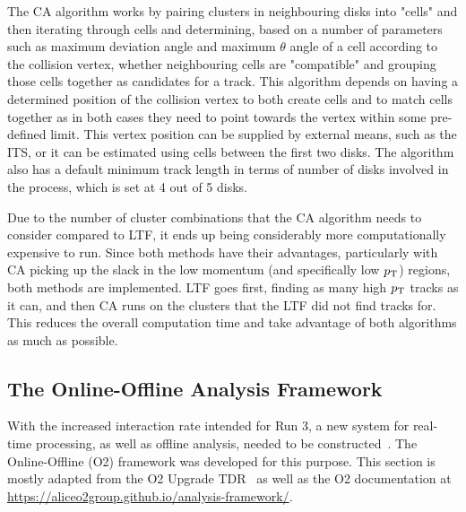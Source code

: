 The CA algorithm works by pairing clusters in neighbouring disks into "cells" and then iterating through cells and determining, based on a number of parameters such as maximum deviation angle and maximum $\theta$ angle of a cell according to the collision vertex, whether neighbouring cells are "compatible" and grouping those cells together as candidates for a track. This algorithm depends on having a determined position of the collision vertex to both create cells and to match cells together as in both cases they need to point towards the vertex within some pre-defined limit. This vertex position can be supplied by external means, such as the ITS, or it can be estimated using cells between the first two disks. The algorithm also has a default minimum track length in terms of number of disks involved in the process, which is set at 4 out of 5 disks. 

Due to the number of cluster combinations that the CA algorithm needs to consider compared to LTF, it ends up being considerably more computationally expensive to run. Since both methods have their advantages, particularly with CA picking up the slack in the low momentum (and specifically low $p_\mathrm{T}$) regions, both methods are implemented. LTF goes first, finding as many high $p_\mathrm{T}$ tracks as it can, and then CA runs on the clusters that the LTF did not find tracks for. This reduces the overall computation time and take advantage of both algorithms as much as possible. 


\subsection{The Online-Offline Analysis Framework}
With the increased interaction rate intended for Run 3, a new system for real-time processing, as well as offline analysis, needed to be constructed~\cite{ALICE_Upgrade_LOI}. The Online-Offline (O2) framework was developed for this purpose. This section is mostly adapted from the O2 Upgrade TDR~\cite{O2_Upgrade_TDR} as well as the O2 documentation at \url{https://aliceo2group.github.io/analysis-framework/}.


